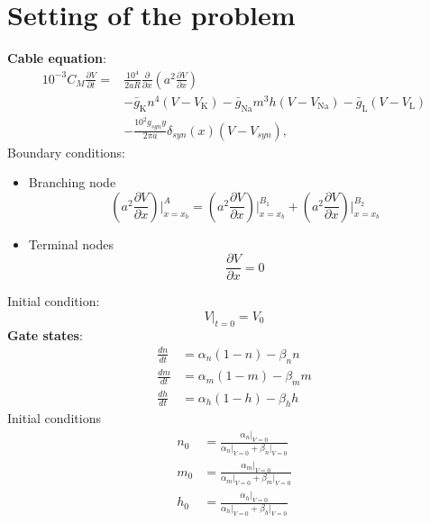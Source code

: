 \documentclass[a4paper,11pt ]{report}
\theoremstyle{definition}
\begin{document}
\chapter{Setting of the problem}
\textbf{Cable equation}:
\begin{align*}
10^{-3}C_M\frac{\partial V}{\partial t}=&\frac{10^4}{2aR}\frac{\partial}{\partial x}\left(a^2\frac{\partial V}{\partial x}\right)\\
&-\bar{g}_\text{K}n^4(V-V_\text{K})- \bar{g}_\text{Na}m^3h(V-V_\text{Na})-\bar{g}_\text{L}(V-V_\text{L})\\
&-\frac{10^2g_{syn}y}{2\pi a}\delta_{syn}(x)(V-V_{syn}),
\end{align*}
Boundary conditions:
\begin{itemize}
\item Branching node
\begin{equation*}
\left( a^2\frac{\partial V}{\partial x}\right)\bigg|_{x=x_b}^A=\left( a^2\frac{\partial V}{\partial x}\right)\bigg|_{x=x_b}^{B_1}+\left( a^2\frac{\partial V}{\partial x}\right)\bigg|_{x=x_b}^{B_2}
\end{equation*}
\item Terminal nodes
\begin{equation*}
\frac{\partial V}{\partial x}=0
\end{equation*}
\end{itemize}
Initial condition:
\begin{equation*}
V\bigg|_{t=0}=V_0
\end{equation*}
\textbf{Gate states}:
\begin{align*}
\frac{dn}{dt}&=\alpha_n(1-n)-\beta_nn\\
\frac{dm}{dt}&=\alpha_m(1-m)-\beta_mm\\
\frac{dh}{dt}&=\alpha_h(1-h)-\beta_hh
\end{align*}
Initial conditions
\begin{align*}
n_0&=\frac{\alpha_n\vert_{V=0}}{\alpha_n\vert_{V=0}+\beta_n\vert_{V=0}}\\
m_0&=\frac{\alpha_m\vert_{V=0}}{\alpha_m\vert_{V=0}+\beta_m\vert_{V=0}}\\
h_0&=\frac{\alpha_h\vert_{V=0}}{\alpha_h\vert_{V=0}+\beta_h\vert_{V=0}}
\end{align*}


\renewcommand\bibname{References}
\printbibliography
{}
\end{document}
